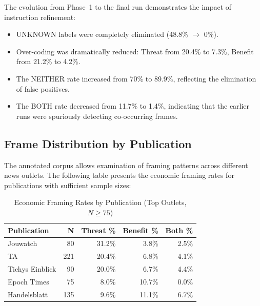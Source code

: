 The evolution from Phase~1 to the final run demonstrates the impact of instruction refinement:
\begin{itemize}
    \item UNKNOWN labels were completely eliminated (48.8\% $\rightarrow$ 0\%).
    \item Over-coding was dramatically reduced: Threat from 20.4\% to 7.3\%, Benefit from 21.2\% to 4.2\%.
    \item The NEITHER rate increased from 70\% to 89.9\%, reflecting the elimination of false positives.
    \item The BOTH rate decreased from 11.7\% to 1.4\%, indicating that the earlier runs were spuriously detecting co-occurring frames.
\end{itemize}

\subsection{Frame Distribution by Publication}

The annotated corpus allows examination of framing patterns across different news outlets. The following table presents the economic framing rates for publications with sufficient sample sizes:

\begin{table}[H]
\centering
\caption{Economic Framing Rates by Publication (Top Outlets, $N \ge 75$)}
\label{tab:by_publication}
\begin{tabular}{@{}lrrrr@{}}
\toprule
\textbf{Publication} & \textbf{N} & \textbf{Threat \%} & \textbf{Benefit \%} & \textbf{Both \%} \\
\midrule
Jouwatch & 80 & 31.2\% & 3.8\% & 2.5\% \\
TA & 221 & 20.4\% & 6.8\% & 4.1\% \\
Tichys Einblick & 90 & 20.0\% & 6.7\% & 4.4\% \\
Epoch Times & 75 & 8.0\% & 10.7\% & 0.0\% \\
Handelsblatt & 135 & 9.6\% & 11.1\% & 6.7\% \\
\bottomrule
\end{tabular}
\end{table}

